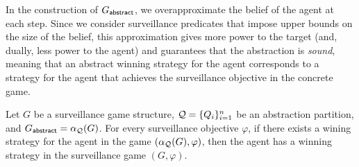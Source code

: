 In the construction of $G_{\mathsf{abstract}}$, we overapproximate the belief of the agent at each step. Since we consider surveillance predicates that impose upper bounds on the size of the belief, this approximation gives more power to the target (and, dually, less power to the agent) and guarantees that the abstraction is \emph{sound}, meaning that an abstract winning strategy for the agent corresponds to a strategy for the agent that achieves the surveillance objective in the concrete game. 

\begin{theorem}
Let $G$ be a surveillance game structure, $\mathcal{Q} = \{Q_i\}_{i=1}^n$ be an abstraction partition, and $G_{\mathsf{abstract}} = \alpha_{\mathcal{Q}}(G)$. For every surveillance objective $\varphi$, if there exists a wining strategy for the agent in the game $(\alpha_{\mathcal{Q}}(G),\varphi)$, then the agent has a  winning strategy in the surveillance game $(G,\varphi)$.
\end{theorem}
